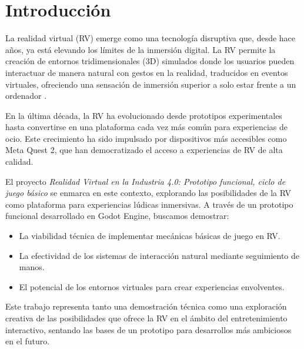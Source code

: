 \documentclass[journal,article,accept,pdftex,moreauthors]{Definitions/mdpi}
\begin{document}
\section{Introducción}
La realidad virtual (RV) emerge como una tecnología disruptiva que, desde hace años, ya está elevando los límites de la inmersión digital. La RV permite la creación de entornos tridimensionales (3D) simulados donde los usuarios pueden interactuar de manera natural con gestos en la realidad, traducidos en eventos virtuales, ofreciendo una sensación de inmersión superior a solo estar frente a un ordenador \cite{techTargetVR}.

En la última década, la RV ha evolucionado desde prototipos experimentales hasta convertirse en una plataforma cada vez más común para experiencias de ocio. Este crecimiento ha sido impulsado por dispositivos más accesibles como Meta Quest 2, que han democratizado el acceso a experiencias de RV de alta calidad.

El proyecto \textit{Realidad Virtual en la Industria 4.0: Prototipo funcional, ciclo de juego básico} se enmarca en este contexto, explorando las posibilidades de la RV como plataforma para experiencias lúdicas inmersivas. A través de un prototipo funcional desarrollado en Godot Engine, buscamos demostrar:

\begin{itemize}
    \item La viabilidad técnica de implementar mecánicas básicas de juego en RV.
    \item La efectividad de los sistemas de interacción natural mediante seguimiento de manos.
    \item El potencial de los entornos virtuales para crear experiencias envolventes.
\end{itemize}

Este trabajo representa tanto una demostración técnica como una exploración creativa de las posibilidades que ofrece la RV en el ámbito del entretenimiento interactivo, sentando las bases de un prototipo para desarrollos más ambiciosos en el futuro.
\end{document}
